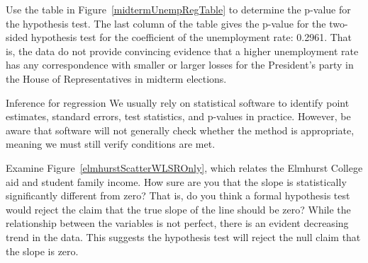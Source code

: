 
\begin{examplewrap}
\begin{nexample}{Use the table in
    Figure~\ref{midtermUnempRegTable}
    to determine the p-value for the hypothesis test.}
  The last column of the table gives the p-value for
  the two-sided hypothesis test for the coefficient of
  the unemployment rate: 0.2961.
  That is, the data do not provide convincing evidence
  that a higher unemployment rate has any correspondence
  with smaller or larger losses for the President's party
  in the House of Representatives in midterm elections.
\end{nexample}
\end{examplewrap}


\begin{onebox}{Inference for regression}
  We usually rely on statistical software to identify point
  estimates, standard errors, test statistics, and p-values
  in practice.
  However, be aware that software will not generally
  check whether the method is appropriate, meaning we must
  still verify conditions are met.
\end{onebox}

\begin{examplewrap}
\begin{nexample}{Examine Figure~\vref{elmhurstScatterWLSROnly},
    which relates the Elmhurst College aid and student family
    income.
    How sure are you that the slope is statistically
    significantly different from zero?
    That is, do you think a formal hypothesis test would reject
    the claim that the true slope of the line should be zero?}
  \label{overallAidIncomeInfAssessOfRegrLineSlope}%
  While the relationship between the variables is not perfect,
  there is an evident decreasing trend in the data.
  This suggests the hypothesis test will reject the null claim
  that the slope is zero.
\end{nexample}
\end{examplewrap}

